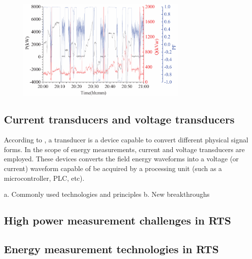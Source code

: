 \begin{figure}[h!]
	\centering
	\begin{minipage}{0.8\textwidth}
		\centering
				\vspace{-0.75em}
		\includegraphics[width=0.75\textwidth,keepaspectratio]{figures/32.EnergyS/liran2014}
				\vspace{-0.75em}
		\label{fig:liran2014}
	\end{minipage}%
	
\end{figure}


\subsection{Current transducers and voltage transducers}
\label{subs:322}	
	According to \cite{webster2012}, a transducer is a device capable to convert different physical signal forms. In the scope of energy measurements, current and voltage transducers are employed. These devices converts the field energy waveforms into a voltage (or current) waveform capable of be acquired by a processing unit (such as a microcontroller, PLC, etc).
	
	
a.	Commonly used technologies and principles
b.	New breakthroughs

\subsection{High power measurement challenges in RTS}	
\label{subs:323}


\subsection{Energy measurement technologies in RTS }
\label{subs:324}

